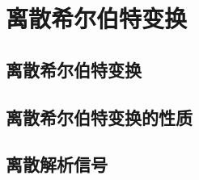 \section{离散希尔伯特变换}\label{sec:D_Hilbert}

\subsection{离散希尔伯特变换}\label{sub:d_hilbert}

\subsection{离散希尔伯特变换的性质}\label{sub:d_prop_of_hilbert}

\subsection{离散解析信号}\label{sub:d_analytic_signal}
